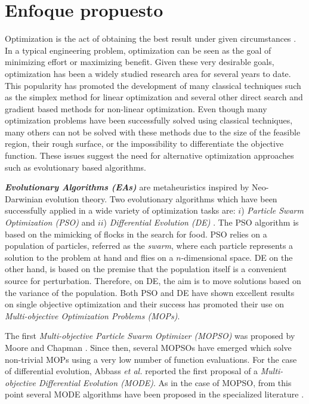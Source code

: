 \chapter{Enfoque propuesto}

Optimization is the act of obtaining the best result under given circumstances \cite{Rao2009}. In a typical engineering problem, optimization can be seen as the goal of minimizing effort or maximizing benefit. Given these very desirable goals, optimization has been a widely studied research area for several years to date. This popularity has promoted the development of many classical techniques such as the simplex method for linear optimization and several other direct search and gradient based methods for non-linear optimization. Even though many optimization problems have been successfully solved using classical techniques, many others can not be solved with these methods due to the size of the feasible region, their rough surface, or the impossibility to differentiate the objective function. These issues suggest the need for alternative optimization approaches such as evolutionary based algorithms. 


\textbf{\emph{Evolutionary Algorithms (EAs)}} are metaheuristics inspired by Neo-Darwinian evolution theory. Two evolutionary algorithms which have been successfully applied in a wide variety of optimization tasks are: $i$) \emph{Particle Swarm Optimization (PSO)} \cite{Kennedy1995} and $ii$) \emph{Differential Evolution (DE)} \cite{Price1997}. The PSO algorithm is based on the mimicking of flocks in the search for food. PSO relies on a population of particles, referred as the \emph{swarm}, where each particle represents a solution to the problem at hand and flies on a $n$-dimensional space. DE on the other hand, is based on the premise that the population itself is a convenient source for perturbation. Therefore, on DE, the aim is to move solutions based on the variance of the population.  Both PSO and DE have shown excellent results on single objective optimization and their success has promoted their use on \emph{Multi-objective Optimization Problems (MOPs)}.

The first \emph{Multi-objective Particle Swarm Optimizer (MOPSO)} was proposed by Moore and Chapman \cite{Moore99}. Since then, several MOPSOs \cite{Reyes06,Toscano05,Branke06,Coello04} have emerged which solve non-trivial MOPs using a very low number of function evaluations. For the case of differential evolution, Abbass \emph{et al.} \cite{Abbass01} reported the first proposal of a \emph{Multi-objective Differential Evolution (MODE)}. As in the case of MOPSO, from this point several MODE algorithms have been proposed in the specialized literature \cite{Robic05,Santana05,Xue03}.


